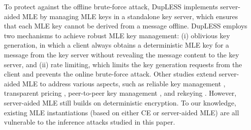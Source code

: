 \documentclass[bachelor]{thesis-uestc}
\begin{document}
	

To protect against the offline brute-force attack, DupLESS \cite{bellare13b}
implements server-aided MLE by managing MLE keys in a standalone key server,
which ensures that each MLE key cannot be derived from a message offline.
DupLESS employs two mechanisms to achieve robust MLE key management: (i)
oblivious key generation, in which a client always obtains a deterministic MLE
key for a message from the key server without revealing the message content to
the key server, and (ii) rate limiting, which limits the key generation
requests from the client and prevents the online brute-force attack.  Other
studies extend server-aided MLE to address various aspects, such as reliable
key management \cite{duan14}, transparent pricing \cite{armknecht15},
peer-to-peer key management \cite{liu15}, and rekeying \cite{qin17}.  However,
server-aided MLE still builds on deterministic encryption.  To our
knowledge, existing MLE instantiations (based on either CE or server-aided
MLE) are all vulnerable to the inference attacks studied in this paper.  


\end{document}
